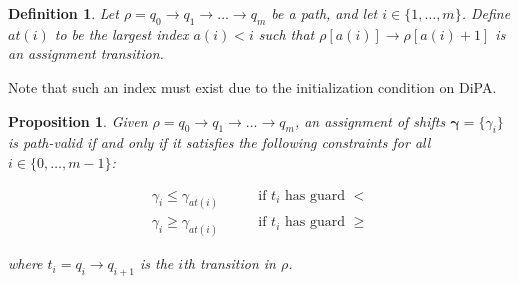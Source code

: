 \documentclass{article}
\newtheorem{proposition}{Proposition}[section]
\newtheorem{definition}{Definition}[section]
\newcommand{\1}{\langle 1 \rangle}
\newcommand{\2}{\langle 2 \rangle}
\begin{document}
\begin{definition}
    Let $\rho = q_0 \to q_1 \to \dots \to q_m$ be a path, and let $i \in \{1, \dots, m\}$. Define $at(i)$ to be the largest index $a(i) < i$ such that $\rho[a(i)] \to \rho[a(i) + 1]$ is an assignment transition.  
\end{definition}

Note that such an index must exist due to the initialization condition on DiPA. 

\begin{proposition}
    Given $\rho = q_0 \to q_1 \to \dots \to q_m$, an assignment of shifts $\boldsymbol{\gamma} = \{\gamma_i\}$ is path-valid if and only if it satisfies the following constraints for all $i \in \{0, \dots, m - 1\}$:

    \begin{align}
        \gamma_i \leq \gamma_{at(i)} \qquad &\text{if } t_i \text{ has guard } < \\
        \gamma_i \geq \gamma_{at(i)} \qquad &\text{if } t_i \text{ has guard } \geq 
    \end{align}

    where $t_i = q_i \to q_{i + 1}$ is the $i$th transition in $\rho$.
\end{proposition}
\end{document}
